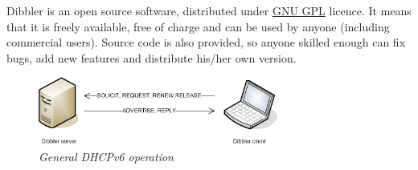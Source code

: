 Dibbler is an open source software, distributed under
\href{http://www.gnu.org/copyleft/gpl.html}{GNU GPL} licence. It means 
that it is freely available, free of charge and can be used by anyone
(including commercial users). Source code is also provided, so anyone
skilled enough can fix bugs, add new features and distribute his/her
own version.

\begin{figure}[ht]
\begin{center}
\includegraphics[width=0.7\textwidth]{dibbler-srv-cli}
\caption{\emph{General DHCPv6 operation}}
\end{center}
\end{figure}

